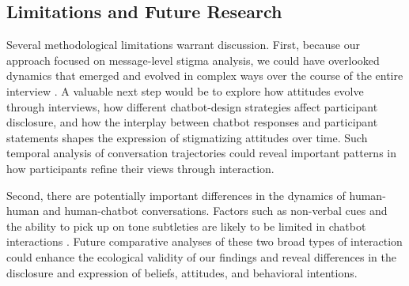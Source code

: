 \subsection{Limitations and Future Research}

Several methodological limitations warrant discussion. 
First, because our approach focused on message-level stigma analysis, we could have overlooked dynamics that emerged and evolved in complex ways over the course of the entire interview \cite{conversation_level_paakki_2024}. 
A valuable next step would be to explore how attitudes evolve through interviews, how different chatbot-design strategies affect participant disclosure, and how the interplay between chatbot responses and participant statements shapes the expression of stigmatizing attitudes over time. 
Such temporal analysis of conversation trajectories could reveal important patterns in how participants refine their views through interaction.


Second, there are potentially important differences in the dynamics of human-human and human-chatbot conversations. 
Factors such as non-verbal cues and the ability to pick up on tone subtleties are likely to be limited in chatbot interactions \cite{nonverbal_denham_2013}. 
Future comparative analyses of these two broad types of interaction could enhance the ecological validity of our findings and reveal differences in the disclosure and expression of beliefs, attitudes, and behavioral intentions.




